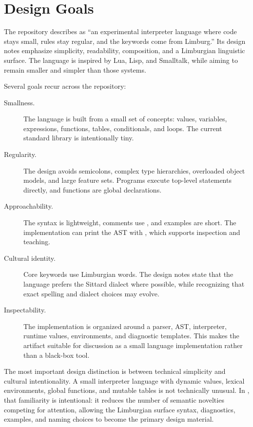 \section{Design Goals}

The repository describes \plat{} as ``an experimental interpreter language
where code stays small, rules stay regular, and the keywords come from
Limburg.'' Its design notes emphasize simplicity, readability, composition,
and a Limburgian linguistic surface. The language is inspired by Lua, Lisp,
and Smalltalk, while aiming to remain smaller and simpler than those systems.

Several goals recur across the repository:

\begin{description}
  \item[Smallness.] The language is built from a small set of concepts:
        values, variables, expressions, functions, tables, conditionals, and
        loops. The current standard library is intentionally tiny.
  \item[Regularity.] The design avoids semicolons, complex type hierarchies,
        overloaded object models, and large feature sets. Programs execute
        top-level statements directly, and functions are global declarations.
  \item[Approachability.] The syntax is lightweight, comments use \code{\#},
        and examples are short. The implementation can print the AST with
        , which supports inspection and teaching.
  \item[Cultural identity.] Core keywords use Limburgian words. The design
        notes state that the language prefers the Sittard dialect where
        possible, while recognizing that exact spelling and dialect choices
        may evolve.
  \item[Inspectability.] The implementation is organized around a parser,
        AST, interpreter, runtime values, environments, and diagnostic
        templates. This makes the artifact suitable for discussion as a small
        language implementation rather than a black-box tool.
\end{description}

The most important design distinction is between technical simplicity and
cultural intentionality. A small interpreter language with dynamic values,
lexical environments, global functions, and mutable tables is not technically
unusual. In \plat, that familiarity is intentional: it reduces the number of
semantic novelties competing for attention, allowing the Limburgian surface
syntax, diagnostics, examples, and naming choices to become the primary design
material.

